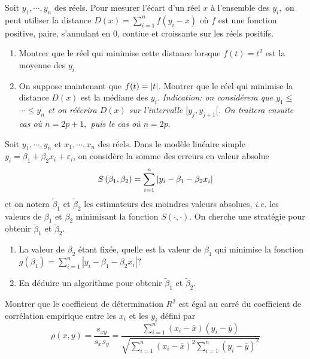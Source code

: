 \documentclass{td_um}
\providecommand{\1}{\mathds{1}}
\begin{document}
\cor{\newpage}

\exo{} 
Soit $y_{1}, \cdots, y_{n}$ des réels. Pour mesurer l'écart d'un réel $x$ à l'ensemble des $y_{i},$ on peut utiliser la distance $D(x)=\sum_{i=1}^{n} f\left(y_{i}-x\right)$ où $f$ est une fonction positive, paire, s'annulant en 0, contiue et croissante sur les réels positifs.
\begin{enumerate}
    \item Montrer que le réel qui minimise cette distance lorsque $f(t)=t^{2}$ est la moyenne des $y_{i}$
    \item On suppose maintenant que $f(t)=\left\lvert t\right\rvert$. Montrer que le réel qui minimise la distance $D(x)$ est la médiane des $y_{i}$. {\it Indication: on considérera que $y_{1} \leq$ $\cdots \leq y_{n}$ et on réécrira $D(x)$ sur l'intervalle $[y_{j}, y_{j+1}[$. On traitera ensuite cas où $n=2 p+1,$ puis le cas où $n=2 p$}.

\end{enumerate}

\cor{\newpage}

\exo{} Soit $y_{1}, \cdots, y_{n}$ et $x_{1}, \cdots, x_{n}$ des réels. Dans le modèle linéaire simple $y_{i}=\beta_{1}+\beta_{2} x_{i}+\varepsilon_{i}$, on considère la somme des erreurs en valeur absolue
\[
    S\left(\beta_{1}, \beta_{2}\right)=\sum_{i=1}^{n}\left\lvert y_{i}-\beta_{1}-\beta_{2} x_{i}\right\rvert
\]
et on notera $\tilde{\beta}_{1}$ et $\tilde{\beta}_{2}$ les estimateurs des moindres valeurs absolues, \textit{i.e.} les valeurs de $\beta_{1}$ et $\beta_{2}$ minimisant la fonction $S(\cdot, \cdot)$. On cherche une stratégie pour obtenir $\tilde{\beta}_{1}$ et $\tilde{\beta}_{2}$.
\begin{enumerate}
 \item La valeur de $\beta_{2}$ étant fixée, quelle est la valeur de $\beta_{1}$ qui minimise la fonction $g\left(\beta_{1}\right)=\sum_{i=1}^{n}\left|y_{i}-\beta_{1}-\beta_{2} x_{i}\right| ?$
 \item En déduire un algorithme pour obtenir $\tilde{\beta}_{1}$ et $\tilde{\beta}_{2}$.
\end{enumerate}


\cor{\newpage}

\exo{}
Montrer que le coefficient de détermination $R^{2}$ est égal au carré du coefficient de corrélation empirique entre les $x_{i}$ et les $y_{i}$ défini par
\[
\rho(x, y)=\frac{s_{x y}}{s_{x} s_{y}}=\frac{\sum_{i=1}^{n}\left(x_{i}-\bar{x}\right)\left(y_{i}-\bar{y}\right)}{\sqrt{\sum_{i=1}^{n}\left(x_{i}-\bar{x}\right)^{2} \sum_{i=1}^{n}\left(y_{i}-\bar{y}\right)^{2}}}
\]
\end{document}
